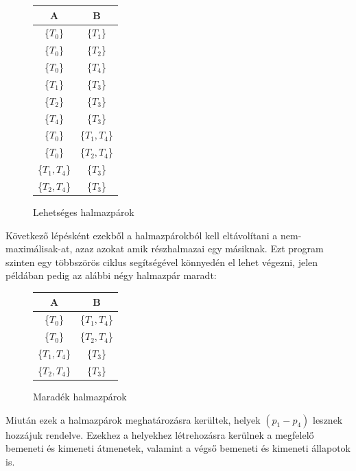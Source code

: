 \begin{example}
	\begin{figure}[h]
	\begin{center}
	\caption{Lehetséges halmazpárok}
	\begin{tabular}{|| c | c ||}
		\hline
		A & B \\
		\hline\hline
		\{$T_0$\} & \{$T_1$\} \\
		\hline
		\{$T_0$\} & \{$T_2$\} \\
		\hline
		\{$T_0$\} & \{$T_4$\} \\
		\hline
		\{$T_1$\} & \{$T_3$\} \\
		\hline
		\{$T_2$\} & \{$T_3$\} \\
		\hline
		\{$T_4$\} & \{$T_3$\} \\
		\hline
		\{$T_0$\} & \{$T_1, T_4$\} \\
		\hline
		\{$T_0$\} & \{$T_2, T_4$\} \\
		\hline
		\{$T_1, T_4$\} & \{$T_3$\} \\
		\hline
		\{$T_2, T_4$\} & \{$T_3$\} \\
		\hline
	\end{tabular}
	\label{fig:planexample}
	\end{center}
	\end{figure}	

	Következő lépésként ezekből a halmazpárokból kell eltávolítani a nem-maximálisak\hyp{}at, azaz azokat amik részhalmazai egy másiknak. Ezt program szinten egy többszörös ciklus segítségével könnyedén el lehet végezni, jelen példában pedig az alábbi négy halmazpár maradt:
	
	\begin{figure}[h]
	\begin{center}
	\caption{Maradék halmazpárok}
	\begin{tabular}{|| c | c ||}
		\hline
		A & B \\
		\hline\hline
		\{$T_0$\} & \{$T_1, T_4$\} \\
		\hline
		\{$T_0$\} & \{$T_2, T_4$\} \\
		\hline
		\{$T_1, T_4$\} & \{$T_3$\} \\
		\hline
		\{$T_2, T_4$\} & \{$T_3$\} \\
		\hline
	\end{tabular}
	\label{fig:planexample}
	\end{center}
	\end{figure}

	Miután ezek a halmazpárok meghatározásra kerültek, helyek $(p_1-p_4)$  lesznek hozzájuk rendelve. Ezekhez a helyekhez létrehozásra kerülnek a megfelelő bemeneti és kimeneti átmenetek, valamint a végső bemeneti és kimeneti állapotok is.


\end{example}
